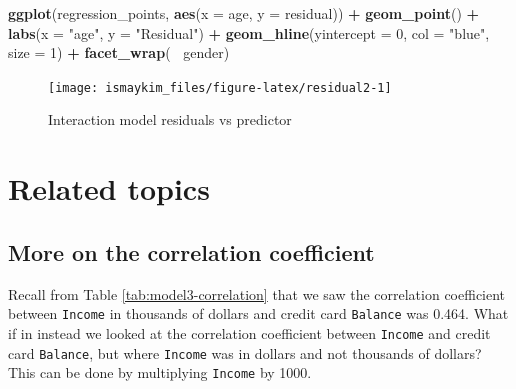 \documentclass[12pt,]{krantz}
\makeatletter
\newenvironment{Shaded}{\begin{snugshade}}{\end{snugshade}}
\newcommand{\KeywordTok}[1]{\textcolor[rgb]{0.27,0.27,0.27}{\textbf{#1}}}
\newcommand{\DataTypeTok}[1]{\textcolor[rgb]{0.27,0.27,0.27}{#1}}
\newcommand{\DecValTok}[1]{\textcolor[rgb]{0.06,0.06,0.06}{#1}}
\newcommand{\StringTok}[1]{\textcolor[rgb]{0.5,0.5,0.5}{#1}}
\newcommand{\OperatorTok}[1]{\textcolor[rgb]{0.43,0.43,0.43}{\textbf{#1}}}
\newcommand{\NormalTok}[1]{#1}
\newenvironment{kframe}{%
\medskip{}
\setlength{\fboxsep}{.8em}
 \def\at@end@of@kframe{}%
 \ifinner\ifhmode%
  \def\at@end@of@kframe{\end{minipage}}%
  \begin{minipage}{\columnwidth}%
 \fi\fi%
 \def\FrameCommand##1{\hskip\@totalleftmargin \hskip-\fboxsep
 \colorbox{shadecolor}{##1}\hskip-\fboxsep
     \hskip-\linewidth \hskip-\@totalleftmargin \hskip\columnwidth}%
 \MakeFramed {\advance\hsize-\width
   \@totalleftmargin\z@ \linewidth\hsize
   \@setminipage}}%
 {\par\unskip\endMakeFramed%
 \at@end@of@kframe}
\renewenvironment{Shaded}{\begin{kframe}}{\end{kframe}}
\theoremstyle{definition}
\theoremstyle{definition}
\theoremstyle{definition}
\theoremstyle{remark}
\makeatother
\begin{document}
\begin{Shaded}
\begin{Highlighting}[]
\KeywordTok{ggplot}\NormalTok{(regression_points, }\KeywordTok{aes}\NormalTok{(}\DataTypeTok{x =}\NormalTok{ age, }\DataTypeTok{y =}\NormalTok{ residual)) }\OperatorTok{+}
\StringTok{  }\KeywordTok{geom_point}\NormalTok{() }\OperatorTok{+}
\StringTok{  }\KeywordTok{labs}\NormalTok{(}\DataTypeTok{x =} \StringTok{"age"}\NormalTok{, }\DataTypeTok{y =} \StringTok{"Residual"}\NormalTok{) }\OperatorTok{+}
\StringTok{  }\KeywordTok{geom_hline}\NormalTok{(}\DataTypeTok{yintercept =} \DecValTok{0}\NormalTok{, }\DataTypeTok{col =} \StringTok{"blue"}\NormalTok{, }\DataTypeTok{size =} \DecValTok{1}\NormalTok{) }\OperatorTok{+}
\StringTok{  }\KeywordTok{facet_wrap}\NormalTok{(}\OperatorTok{~}\StringTok{ }\NormalTok{gender)}
\end{Highlighting}
\end{Shaded}

\begin{figure}

{\centering \texttt{[image: ismaykim\_files/figure-latex/residual2-1]} 

}

\caption{Interaction model residuals vs predictor}\label{fig:residual2}
\end{figure}

\section{Related topics}\label{related-topics-1}

\subsection{More on the correlation
coefficient}\label{correlationcoefficient2}

Recall from Table \ref{tab:model3-correlation} that we saw the
correlation coefficient between \texttt{Income} in thousands of dollars
and credit card \texttt{Balance} was 0.464. What if in instead we looked
at the correlation coefficient between \texttt{Income} and credit card
\texttt{Balance}, but where \texttt{Income} was in dollars and not
thousands of dollars? This can be done by multiplying \texttt{Income} by
1000.

\begin{Shaded}
\end{Shaded}
\end{document}
